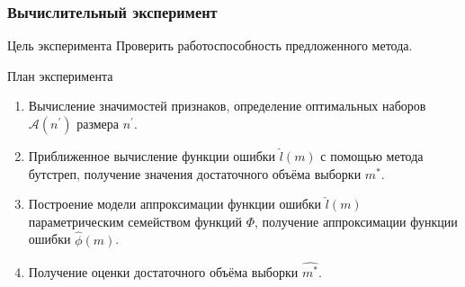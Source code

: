 \documentclass{beamer}
\begin{document}
\begin{frame}
\frametitle{Вычислительный эксперимент}
\begin{block}{Цель эксперимента}
Проверить работоспособность предложенного метода.
\end{block}

\begin{block}{План эксперимента}
\begin{enumerate}
	\item Вычисление значимостей признаков, определение оптимальных наборов $\mathcal{A}(n^{\prime})$ размера $n^{\prime}$.
	\item Приближенное вычисление функции ошибки $\hat{l}(m)$ с помощью метода бутстреп, получение значения достаточного объёма выборки $m^*$.
	\item Построение модели аппроксимации функции ошибки  $\hat{l}(m)$ параметрическим семейством функций $\Phi$, получение аппроксимации функции ошибки $\hat{\phi}(m)$.
	\item Получение оценки достаточного объёма выборки $\hat{m^*}$.
\end{enumerate}
\end{block}

\end{frame}
\end{document}

